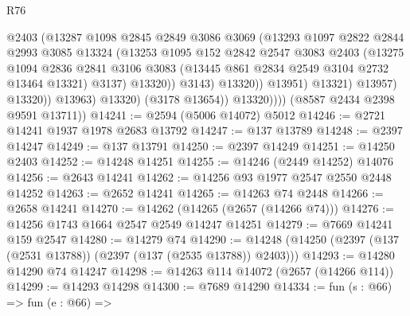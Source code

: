 \begin{lexlean}{R76}
\begin{coremodule}
                                  @2403
                                  (@13287
                                    @1098
                                    @2845
                                    @2849
                                    @3086
                                    @3069
                                    (@13293
                                      @1097
                                      @2822
                                      @2844
                                      @2993
                                      @3085
                                      @13324
                                      (@13253
                                        @1095
                                        @152
                                        @2842
                                        @2547
                                        @3083
                                        @2403
                                        (@13275
                                          @1094
                                          @2836
                                          @2841
                                          @3106
                                          @3083
                                          (@13445 @861 @2834 @2549 @3104 @2732 @13464 @13321)
                                          @3137)
                                        @13320))
                                    @3143)
                                  @13320))
                              @13951)
                            @13321)
                          @13957)
                        @13320))
                    @13963)
                  @13320)
                (@3178 @13654))
              @13320))))
      (@8587 @2434 @2398 @9591 @13711))
@14241 := @2594 (@5006 @14072) @5012
@14246 := @2721 @14241 @1937 @1978 @2683 @13792
@14247 := @137 @13789
@14248 := @2397 @14247
@14249 := @137 @13791
@14250 := @2397 @14249
@14251 := @14250 @2403
@14252 := @14248 @14251
@14255 := @14246 (@2449 @14252) @14076
@14256 := @2643 @14241
@14262 := @14256 @93 @1977 @2547 @2550 @2448 @14252
@14263 := @2652 @14241
@14265 := @14263 @74 @2448
@14266 := @2658 @14241
@14270 := @14262 (@14265 (@2657 (@14266 @74)))
@14276 := @14256 @1743 @1664 @2547 @2549 @14247 @14251
@14279 := @7669 @14241 @159 @2547
@14280 := @14279 @74
@14290 := @14248 (@14250 (@2397 (@137 (@2531 @13788)) (@2397 (@137 (@2535 @13788)) @2403)))
@14293 := @14280 @14290 @74 @14247
@14298 := @14263 @114 @14072 (@2657 (@14266 @114))
@14299 := @14293 @14298
@14300 := @7689 @14290
@14334 := fun (s : @66) =>
  fun (e : @66) =>

\end{coremodule}
\end{lexlean}
